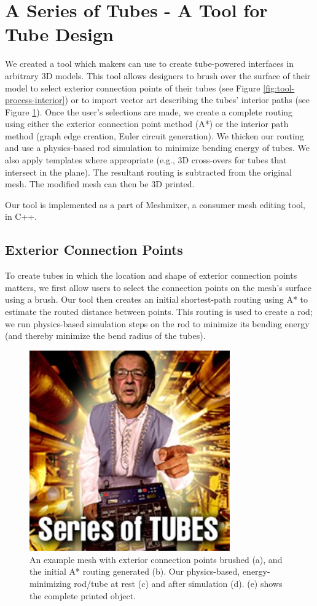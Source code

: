 \section{A Series of Tubes - A Tool for Tube Design}

We created a tool which makers can use to create tube-powered interfaces in arbitrary 3D models.  This tool allows designers to brush over the surface of their model to select exterior connection points of their tubes (see Figure \ref{fig:tool-process-interior}) or to import vector art describing the tubes' interior paths (see Figure \ref{fig:tool-process-exterior}).  Once the user's selections are made, we create a complete routing using either the exterior connection point method (A*) or the interior path method (graph edge creation, Euler circuit generation).  We thicken our routing and use a physics-based rod simulation to minimize bending energy of tubes.  We also apply templates where appropriate (e.g., 3D cross-overs for tubes that intersect in the plane).  The resultant routing is subtracted from the original mesh.  The modified mesh can then be 3D printed.

Our tool is implemented as a part of Meshmixer, a consumer mesh editing tool, in C++.

\subsection{Exterior Connection Points}

To create tubes in which the location and shape of exterior connection points matters, we first allow users to select the connection points on the mesh's surface using a brush. Our tool then creates an initial shortest-path routing using A* to estimate the routed distance between points.  This routing is used to create a rod; we run physics-based simulation steps on the rod to minimize its bending energy (and thereby minimize the bend radius of the tubes).

\begin{figure}[h!]
\centering
    \includegraphics[width=3.4in]{figures/series-of-tubes.jpg}
\caption{An example mesh with exterior connection points brushed (a), and the initial A* routing generated (b).  Our physics-based, energy-minimizing rod/tube at rest (c) and after simulation (d).  (e) shows the complete printed object.}
\label{fig:tool-process-exterior}
\end{figure}

